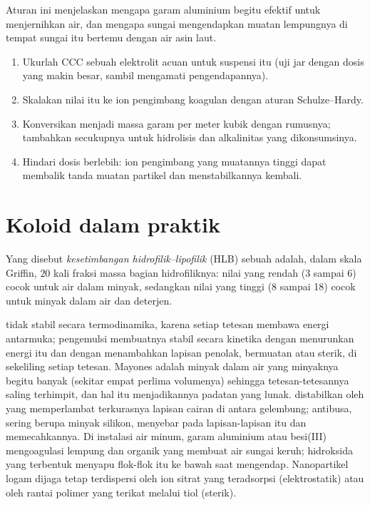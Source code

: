 Aturan ini menjelaskan mengapa garam aluminium begitu efektif untuk
menjernihkan air, dan mengapa sungai mengendapkan muatan lempungnya di tempat
sungai itu bertemu dengan air asin laut.

\begin{method}\label{met:b3:colloids:coagulant-dose}
\begin{enumerate}
  \item Ukurlah CCC sebuah elektrolit acuan untuk suspensi itu (uji jar dengan
        dosis yang makin besar, sambil mengamati pengendapannya).
  \item Skalakan nilai itu ke ion pengimbang koagulan dengan aturan Schulze--Hardy.
  \item Konversikan menjadi massa garam per meter kubik dengan rumusnya; tambahkan
        secukupnya untuk hidrolisis dan alkalinitas yang dikonsumsinya.
  \item Hindari dosis berlebih: ion pengimbang yang muatannya tinggi dapat membalik
        tanda muatan partikel dan menstabilkannya kembali.
\end{enumerate}
\end{method}

\section{Koloid dalam praktik}

\begin{definition}\label{def:b3:colloids:hlb}
Yang disebut \emph{kesetimbangan hidrofilik--lipofilik}
(HLB) sebuah  adalah, dalam skala Griffin, $20$ kali fraksi
massa bagian hidrofiliknya: nilai yang rendah (3 sampai 6) cocok untuk 
air dalam minyak, sedangkan nilai yang tinggi (8 sampai 18) cocok untuk 
minyak dalam air dan deterjen.
\end{definition}

 tidak stabil secara termodinamika, karena setiap tetesan membawa energi
antarmuka; pengemulsi membuatnya stabil secara kinetika dengan menurunkan
energi itu dan dengan menambahkan lapisan penolak, bermuatan atau sterik, di
sekeliling setiap tetesan. Mayones adalah  minyak dalam air yang
minyaknya begitu banyak (sekitar empat perlima volumenya) sehingga
tetesan-tetesannya saling terhimpit, dan hal itu menjadikannya padatan yang
lunak.  distabilkan oleh  yang memperlambat terkurasnya lapisan
cairan di antara gelembung; antibusa, sering berupa minyak silikon, menyebar
pada lapisan-lapisan itu dan memecahkannya. Di instalasi air minum, garam
aluminium atau besi(III) mengoagulasi lempung dan  organik yang membuat air
sungai keruh; hidroksida yang terbentuk menyapu flok-flok itu ke bawah saat
mengendap. Nanopartikel logam dijaga tetap terdispersi oleh ion sitrat yang
teradsorpsi (elektrostatik) atau oleh rantai polimer yang terikat melalui
tiol (sterik).

